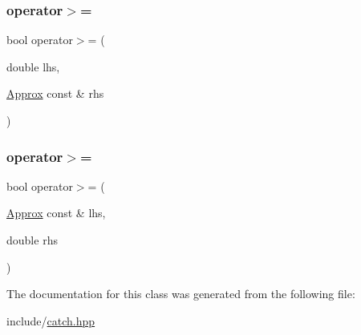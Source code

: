 \mbox{\label{class_catch_1_1_detail_1_1_approx_a4e60095c615a0e6bdd6e8663cd24090b}} 
\subsubsection{\texorpdfstring{operator$>$=}{operator>=}\hspace{0.1cm}{\footnotesize\ttfamily [1/2]}}
{\footnotesize\ttfamily bool operator$>$= (\begin{DoxyParamCaption}\item[{double}]{lhs,  }\item[{\mbox{\hyperlink{class_catch_1_1_detail_1_1_approx}{Approx}} const \&}]{rhs }\end{DoxyParamCaption})\hspace{0.3cm}{\ttfamily [friend]}}

\mbox{\label{class_catch_1_1_detail_1_1_approx_adaba11ee9aabb4d51d4855f09aa7f7df}} 
\subsubsection{\texorpdfstring{operator$>$=}{operator>=}\hspace{0.1cm}{\footnotesize\ttfamily [2/2]}}
{\footnotesize\ttfamily bool operator$>$= (\begin{DoxyParamCaption}\item[{\mbox{\hyperlink{class_catch_1_1_detail_1_1_approx}{Approx}} const \&}]{lhs,  }\item[{double}]{rhs }\end{DoxyParamCaption})\hspace{0.3cm}{\ttfamily [friend]}}



The documentation for this class was generated from the following file\+:\begin{DoxyCompactItemize}
\item 
include/\mbox{\hyperlink{catch_8hpp}{catch.\+hpp}}\end{DoxyCompactItemize}
